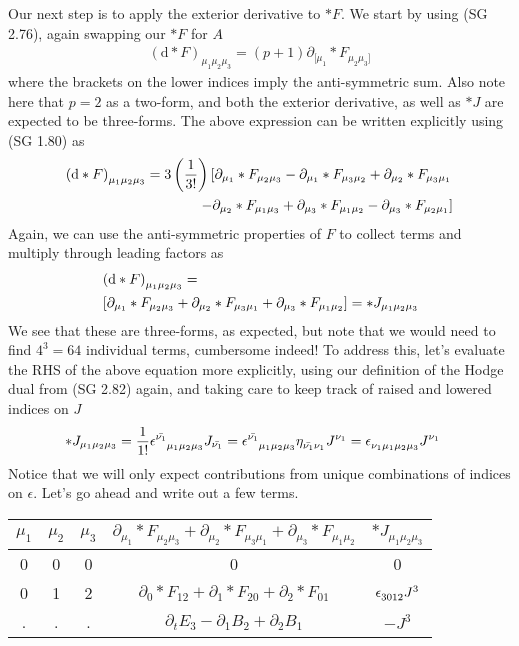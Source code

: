 Our next step is to apply the exterior derivative to $\ast F$. We start by using (SG 2.76), again swapping our $\ast F$ for $A$
%
\begin{align}
	\left(\textrm{d} \ast F\right)_{\mu_1\mu_2\mu_3} = (p+1) \partial_{[\mu_1} \ast F_{\mu_2\mu_3]}
\end{align}
%
where the brackets on the lower indices imply the anti-symmetric sum. Also note here that $p=2$ as a two-form, and both the exterior derivative, as well as $\ast J$ are expected to be three-forms. The above expression can be written explicitly using (SG 1.80) as 
%
\begin{align}
	\left(\textrm{d} \ast F\right)_{\mu_1\mu_2\mu_3} = 3 \left(\frac{1}{3!}\right) \left[ \partial_{\mu_1} \ast F_{\mu_2\mu_3} - \partial_{\mu_1} \ast F_{\mu_3\mu_2} + \partial_{\mu_2} \ast F_{\mu_3\mu_1}  \right. \notag \\ \left. - \partial_{\mu_2} \ast F_{\mu_1\mu_3} + \partial_{\mu_3} \ast F_{\mu_1\mu_2} - \partial_{\mu_3} \ast F_{\mu_2\mu_1} \right]
\end{align}
%
Again, we can use the anti-symmetric properties of $F$ to collect terms and multiply through leading factors as 
%
\begin{align}
	&\left(\textrm{d} \ast F\right)_{\mu_1\mu_2\mu_3} = \notag \\ &\left[ \partial_{\mu_1} \ast F_{\mu_2\mu_3} + \partial_{\mu_2} \ast F_{\mu_3\mu_1}  + \partial_{\mu_3} \ast F_{\mu_1\mu_2} \right] = \ast J_{\mu_1\mu_2\mu_3} 
\end{align}
%
We see that these are three-forms, as expected, but note that we would need to find $4^3 = 64$ individual terms, cumbersome indeed! To address this, let's evaluate the RHS of the above equation more explicitly, using our definition of the Hodge dual from (SG 2.82) again, and taking care to keep track of raised and lowered indices on $J$
%
\begin{align}
\ast J_{\mu_1\mu_2\mu_3} &= \frac{1}{1!} \epsilon\indices{^{{\bar{\nu_1}}}_{{\mu_1}{\mu_2}{\mu_3}}} J_{\bar{\nu_1}} 
= \epsilon\indices{^{{\bar{\nu_1}}}_{{\mu_1}{\mu_2}{\mu_3}}} \eta\indices{_{\bar{\nu_1}\nu_1}} J\indices{^{\nu_1}}
= \epsilon\indices{_{{\nu_1}{\mu_1}{\mu_2}{\mu_3}}} J\indices{^{\nu_1}}
\end{align} 
%
Notice that we will only expect contributions from unique combinations of indices on $\epsilon$. Let's go ahead and write out a few terms. 
%
\begin{center}
	\begin{tabular}{| c | c | c | c | c |} 
		\hline
		$\mu_1$ & $\mu_2$ & $\mu_3$ & $\partial_{\mu_1} \ast F_{\mu_2\mu_3} + \partial_{\mu_2} \ast F_{\mu_3\mu_1} + \partial_{\mu_3} \ast F_{\mu_1\mu_2}$ & $\ast J_{\mu_1 \mu_2 \mu_3}$ \\
		\hline\hline
		0 & 0 & 0 & 0 & 0 \\ 
		0 & 1 & 2 & $\partial_{0} \ast F_{12} + \partial_{1} \ast F_{20} + \partial_{2} \ast F_{01}$ & $\epsilon\indices{_{{3}{0}{1}{2}}}J^3$\\
		. & . & . & $\partial_{t} E_3 - \partial_{1} B_2 + \partial_{2} B_1$ & $-J^3$ \\
		\hline
	\end{tabular}
\end{center}
